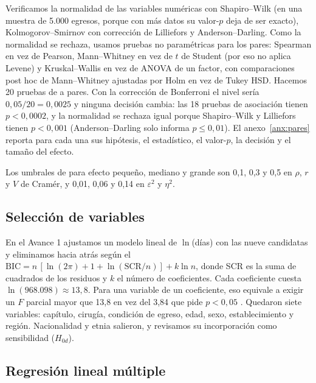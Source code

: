 \documentclass[10.5pt,a4paper,headings=small,abstract=false,bibliography=totoc,listof=totoc]{scrartcl}
\newcommand{\anexo}[1]{anexo~\ref{#1}}
\begin{document}
Verificamos la normalidad de las variables numéricas con Shapiro--Wilk \citep{shapiro1965} (en una muestra de 5.000 egresos, porque con más datos su valor-$p$ deja de ser exacto), Kolmogorov--Smirnov con corrección de Lilliefors \citep{lilliefors1967} y Anderson--Darling. Como la normalidad se rechaza, usamos pruebas no paramétricas para los pares: Spearman en vez de Pearson, Mann--Whitney en vez de $t$ de Student (por eso no aplica Levene) y Kruskal--Wallis en vez de ANOVA de un factor, con comparaciones post hoc de Mann--Whitney ajustadas por Holm \citep{holm1979} en vez de Tukey HSD. Hacemos 20 pruebas de a pares. Con la corrección de Bonferroni el nivel sería $0{,}05/20=0{,}0025$ y ninguna decisión cambia: las 18 pruebas de asociación tienen $p<0{,}0002$, y la normalidad se rechaza igual porque Shapiro--Wilk y Lilliefors tienen $p<0{,}001$ (Anderson--Darling solo informa $p\le0{,}01$). El \anexo{anx:pares} reporta para cada una sus hipótesis, el estadístico, el valor-$p$, la decisión y el tamaño del efecto.

Los umbrales de \citet{cohen1988} para efecto pequeño, mediano y grande son 0,1, 0,3 y 0,5 en $\rho$, $r$ y $V$ de Cramér, y 0,01, 0,06 y 0,14 en $\varepsilon^2$ y $\eta^2$.

\subsection{Selección de variables}

En el Avance 1 ajustamos un modelo lineal de $\ln$(días) con las nueve candidatas y eliminamos hacia atrás según el $\mathrm{BIC}=n\,[\ln(2\pi)+1+\ln(\mathrm{SCR}/n)]+k\ln n$, donde SCR es la suma de cuadrados de los residuos y $k$ el número de coeficientes. Cada coeficiente cuesta $\ln(968.098)\approx 13{,}8$. Para una variable de un coeficiente, eso equivale a exigir un $F$ parcial mayor que 13,8 en vez del 3,84 que pide $p<0{,}05$ \citep{raftery1995}. Quedaron siete variables: capítulo, cirugía, condición de egreso, edad, sexo, establecimiento y región. Nacionalidad y etnia salieron, y revisamos su incorporación como sensibilidad ($H_{0d}$).

\subsection{Regresión lineal múltiple}\label{sec:lineal}
\end{document}

